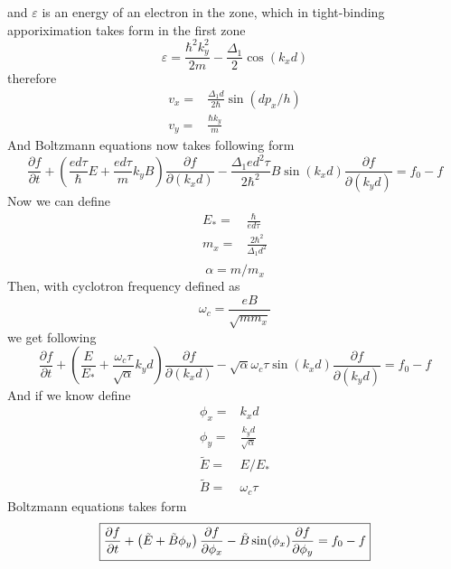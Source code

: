 \documentclass[40pt,letterpaper,physrev]{article}
\begin{document}
    and $\varepsilon$ is an energy of an electron in the zone, which in tight-binding apporiximation takes form in the first zone
    \begin{equation}
     \varepsilon=\frac{\hbar^2k^2_y}{2m}-\frac{\Delta_{1}}{2}\cos(k_{x}d)\label{eq:energy_unscaled}
    \end{equation}
    therefore
    \begin{align}
     v_x=&\frac{\Delta_{1}d}{2\hbar}\sin(dp_x/h) \\
     v_y=&\frac{\hbar k_y}{m}
    \end{align}
    And Boltzmann equations now takes following form
   \begin{equation}
     \frac{\partial f}{\partial t}+
     \left ( \frac{ed\tau}{\hbar}E+\frac{ed\tau}{m}k_yB \right ) \frac{\partial f}{\partial(k_x d)}-
     \frac{\Delta_{1}ed^2\tau}{2\hbar^2}B\sin(k_{x}d)\frac{\partial f}{\partial(k_y d)}
     = f_0 - f
   \end{equation}
   Now we can define
   \begin{align}
	E_*=&\frac{\hbar}{ed\tau} \\	
	m_x=&\frac{2\hbar^2}{\Delta_1 d^2} \\
   \end{align}
   \begin{equation}
	\boxed{\alpha=m/m_x}
   \end{equation}
   Then, with cyclotron frequency defined as 
   \begin{equation}
	\omega_c=\frac{eB}{\sqrt{mm_x}}
   \end{equation}
   we get following
   \begin{equation}
     \frac{\partial f}{\partial t}+
     \left ( \frac{E}{E_*}+\frac{\omega_{c}\tau}{\sqrt{\alpha}}k_yd \right ) \frac{\partial f}{\partial(k_x d)}-
     \sqrt{\alpha}\omega_c\tau\sin(k_x d)\frac{\partial f}{\partial(k_y d)}
     = f_0 - f
   \end{equation}
   And if we know define
   \begin{align}
       \phi_x=&k_{x}d \\
       \phi_y=&\frac{k_{y}d}{\sqrt{\alpha}} \\
       \tilde{E}=&E/E_*\\
       \tilde{B}=&\omega_{c}\tau
   \end{align}
   Boltzmann equations takes form
   \begin{equation}
   	\boxed{
   	\label{eq:boltzmann_final}
     \frac{\partial f}{\partial t}+
     \left ( \tilde{E}+\tilde{B}\phi_y\right ) \frac{\partial f}{\partial\phi_x}-
     \tilde{B}\sin(\phi_x)\frac{\partial f}{\partial\phi_y}
     = f_0 - f}
   \end{equation}
\end{document}
